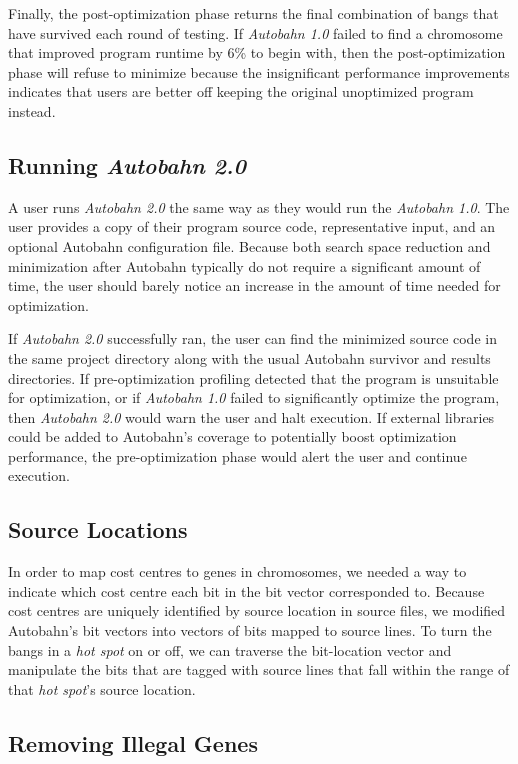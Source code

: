 \documentclass[format=sigplan]{acmart}
\newcommand{\hotspot}[0]{\textit{hot spot}}
\newcommand{\Ao}[0]{\textit{Autobahn 1.0}}
\newcommand{\At}[0]{\textit{Autobahn 2.0}}
\newcommand{\preopt}[0]{pre-optimization}
\newcommand{\postopt}[0]{post-optimization}
\begin{document}
Finally, the \postopt{} phase returns the final combination of bangs that have survived each round of testing. If \Ao{} failed to find a chromosome that improved program runtime by 6\% to begin with, then the \postopt{} phase will refuse to minimize because the insignificant performance improvements indicates that users are better off keeping the original unoptimized program instead.


\subsection{Running \At{}}

A user runs \At{} the same way as they would run the \Ao{}. The user provides a copy of their program source code, representative input, and an optional Autobahn configuration file. Because both search space reduction and minimization after Autobahn typically do not require a significant amount of time, the user should barely notice an increase in the amount of time needed for optimization. 

If \At{} successfully ran, the user can find the minimized source code in the same project directory along with the usual Autobahn survivor and results directories. If \preopt{} profiling detected that the program is unsuitable for optimization, or if \Ao{} failed to significantly optimize the program, then \At{} would warn the user and halt execution. If external libraries could be added to Autobahn's coverage to potentially boost optimization performance, the \preopt{} phase would alert the user and continue execution.

\subsection{Source Locations}

In order to map cost centres to genes in chromosomes, we needed a way to indicate which cost centre each bit in the bit vector corresponded to. Because cost centres are uniquely identified by source location in source files, we modified Autobahn's bit vectors into vectors of bits mapped to source lines. To turn the bangs in a \hotspot{} on or off, we can traverse the bit-location vector and manipulate the bits that are tagged with source lines that fall within the range of that \hotspot{}'s source location.

\subsection{Removing Illegal Genes}
\end{document}
